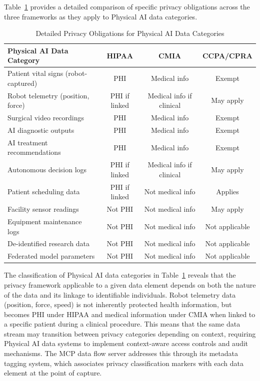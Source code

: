 Table~\ref{tab:privacy-detailed} provides a detailed comparison of specific
privacy obligations across the three frameworks as they apply to Physical AI
data categories.

\begin{table}[H]
\centering
\caption{Detailed Privacy Obligations for Physical AI Data Categories}
\label{tab:privacy-detailed}
\small
\begin{tabularx}{\textwidth}{l c c c}
\toprule
\textbf{Physical AI Data Category} & \textbf{HIPAA} & \textbf{CMIA} & \textbf{CCPA/CPRA} \\
\midrule
Patient vital signs (robot-captured) & PHI & Medical info & Exempt \\
Robot telemetry (position, force) & PHI if linked & Medical info if clinical & May apply \\
Surgical video recordings & PHI & Medical info & Exempt \\
AI diagnostic outputs & PHI & Medical info & Exempt \\
AI treatment recommendations & PHI & Medical info & Exempt \\
Autonomous decision logs & PHI if linked & Medical info if clinical & May apply \\
Patient scheduling data & PHI if linked & Not medical info & Applies \\
Facility sensor readings & Not PHI & Not medical info & May apply \\
Equipment maintenance logs & Not PHI & Not medical info & Not applicable \\
De-identified research data & Not PHI & Not medical info & Not applicable \\
Federated model parameters & Not PHI & Not medical info & Not applicable \\
\bottomrule
\end{tabularx}
\end{table}

The classification of Physical AI data categories in
Table~\ref{tab:privacy-detailed} reveals that the privacy framework
applicable to a given data element depends on both the nature of the data
and its linkage to identifiable individuals. Robot telemetry data
(position, force, speed) is not inherently protected health information, but
becomes PHI under HIPAA and medical information under CMIA when linked to a
specific patient during a clinical procedure. This means that the same data
stream may transition between privacy categories depending on context,
requiring Physical AI data systems to implement context-aware access controls
and audit mechanisms. The MCP data flow server \cite{national-mcp-paper}
addresses this through its metadata tagging system, which associates privacy
classification markers with each data element at the point of capture.

